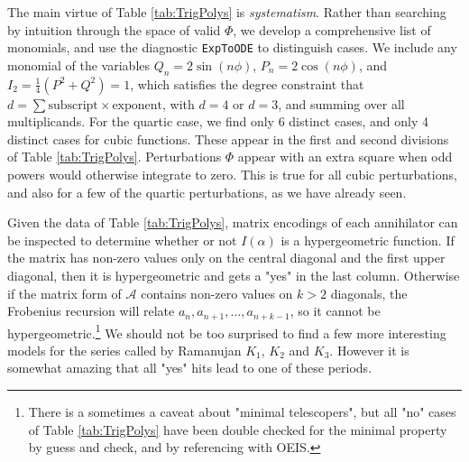 \documentclass[nofootinbib,preprint]{revtex4-1}
\begin{document}
The main virtue of Table \ref{tab:TrigPolys} is \textit{systematism}. Rather than searching
by intuition through the space of valid $\Phi$, we develop a comprehensive list of monomials,
and use the diagnostic \texttt{ExpToODE} to distinguish cases. We include any
monomial of the variables $Q_n=2\sin(n\phi)$,  $P_n=2\cos(n\phi)$, and $I_2=\frac{1}{4}(P^2+Q^2)=1$, 
which satisfies the degree constraint that ${d=\sum \text{subscript} \times \text{exponent}}$, with $d=4$ 
or $d=3$, and summing over all multiplicands. For the quartic case, we 
find only 6 distinct cases,  and only 4 distinct cases for cubic functions. These 
appear in the first and second divisions of Table \ref{tab:TrigPolys}. Perturbations 
$\Phi$ appear with an extra square when odd powers would otherwise integrate 
to zero. This is true for all cubic perturbations, and also for a few of the quartic
perturbations, as we have already seen.

Given the data of Table \ref{tab:TrigPolys}, matrix encodings of each 
annihilator can be inspected to determine whether or not $I(\alpha)$ is a hypergeometric
function. If the matrix has non-zero values only on the central diagonal and the 
first upper diagonal, then it is hypergeometric and gets a "yes" in the last column. 
Otherwise if the matrix form of $\mathcal{A}$ contains non-zero values on $k>2$ diagonals, 
the Frobenius recursion will relate $a_n, a_{n+1},\ldots,a_{n+k-1}$, so it cannot be 
hypergeometric.\footnote{There is a sometimes a caveat about "minimal telescopers", but 
all "no" cases of Table \ref{tab:TrigPolys} have been double checked for the minimal property by guess 
and check, and by referencing with OEIS.} We should not be too surprised to find a few 
more interesting models for the series called by Ramanujan $K_1$, $K_2$ and $K_3$. 
However it is somewhat amazing that all "yes" hits lead to one of these periods. 
\end{document}
